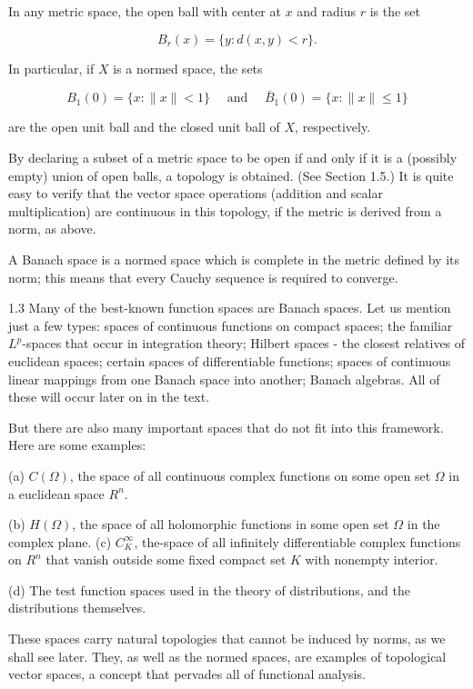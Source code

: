 \documentclass[10pt]{article}
\begin{document}
In any metric space, the open ball with center at $x$ and radius $r$ is the set

$$
B_{r}(x)=\{y: d(x, y)<r\} .
$$

In particular, if $X$ is a normed space, the sets

$$
B_{1}(0)=\{x:\|x\|<1\} \quad \text { and } \quad \bar{B}_{1}(0)=\{x:\|x\| \leq 1\}
$$

are the open unit ball and the closed unit ball of $X$, respectively.

By declaring a subset of a metric space to be open if and only if it is a (possibly empty) union of open balls, a topology is obtained. (See Section 1.5.) It is quite easy to verify that the vector space operations (addition and scalar multiplication) are continuous in this topology, if the metric is derived from a norm, as above.

A Banach space is a normed space which is complete in the metric defined by its norm; this means that every Cauchy sequence is required to converge.

1.3 Many of the best-known function spaces are Banach spaces. Let us mention just a few types: spaces of continuous functions on compact spaces; the familiar $L^{p}$-spaces that occur in integration theory; Hilbert spaces - the closest relatives of euclidean spaces; certain spaces of differentiable functions; spaces of continuous linear mappings from one Banach space into another; Banach algebras. All of these will occur later on in the text.

But there are also many important spaces that do not fit into this framework. Here are some examples:

(a) $C(\Omega)$, the space of all continuous complex functions on some open set $\Omega$ in a euclidean space $R^{n}$.

(b) $H(\Omega)$, the space of all holomorphic functions in some open set $\Omega$ in the complex plane.
(c) $C_{K}^{\infty}$, the-space of all infinitely differentiable complex functions on $R^{n}$ that vanish outside some fixed compact set $K$ with nonempty interior.

(d) The test function spaces used in the theory of distributions, and the distributions themselves.

These spaces carry natural topologies that cannot be induced by norms, as we shall see later. They, as well as the normed spaces, are examples of topological vector spaces, a concept that pervades all of functional analysis.
\end{document}

